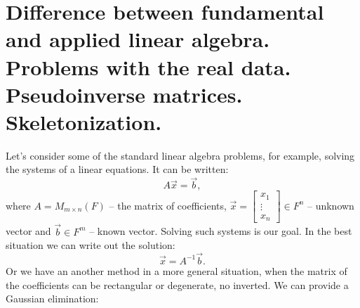     \section{Difference between fundamental and applied linear algebra. Problems with the real data. Pseudoinverse matrices. Skeletonization.}
    \par 
    Let's consider some of the standard linear algebra problems, for example, solving the systems of a linear equations. It can be written:
    \[
        A\vec{x} = \vec{b},    
    \]
    where $A = M_{m \times n}(F)$ -- the matrix of coefficients, $\vec{x} = \begin{bmatrix}
        x_1 \\
        \vdots \\
        x_n
    \end{bmatrix} \in F^n$ -- unknown vector and $\vec{b} \in F^m$ -- known vector. Solving such systems is our goal. In the best situation we can write out the solution:
    \[
        \vec{x} = A^{-1}\vec{b}.
    \]
    Or we have an another method in a more general situation, when the matrix of the coefficients can be rectangular or degenerate, no inverted. We can provide a Gaussian elimination:
